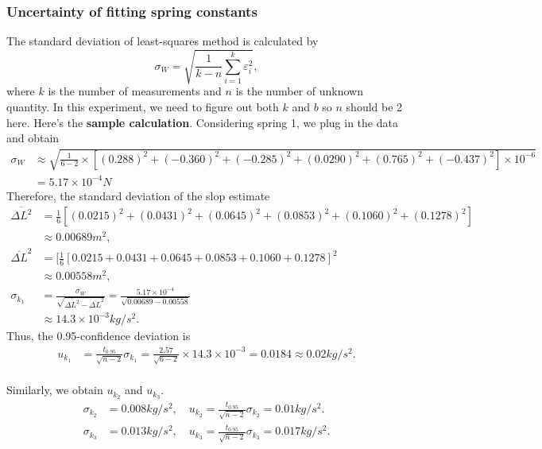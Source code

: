 \subsubsection{Uncertainty of fitting spring constants}
    The standard deviation of least-squares method is calculated by
    \[
        \sigma_W=\sqrt{\frac{1}{k-n}\sum_{i=1}^{k}\varepsilon_i^2},
    \]
    where $k$ is the number of measurements and $n$ is the number of unknown quantity. In this experiment, we need to figure out both $k$ and $b$ so $n$ should be 2 here. Here's the \textbf{sample calculation}. Considering spring 1, we plug in the data and obtain
    \[
    \begin{split}
        \sigma_W&\approx \sqrt{\frac{1}{6-2}\times [(0.288)^2+(-0.360)^2+(-0.285)^2+(0.0290)^2+(0.765)^2+(-0.437)^2]\times 10^{-6}}\\
        &=5.17\times10^{-4} N
    \end{split}
    \]
    Therefore, the standard deviation of the slop estimate
    \[
    \begin{split}
        \overline{\Delta L^2}&=\frac{1}{6}[(0.0215)^2+(0.0431)^2+(0.0645)^2+(0.0853)^2+(0.1060)^2+(0.1278)^2]\\[0.2cm]
        &\approx 0.00689 m^2,\\[0.4cm]
        \overline{\Delta L}^2&=[\frac{1}{6}[0.0215+0.0431+0.0645+0.0853+0.1060+0.1278]^2\\[0.2cm]
        &\approx 0.00558 m^2,\\[0.4cm]
        \sigma_{k_1}&=\frac{\sigma_W}{\sqrt{\overline{\Delta L^2}-\overline{\Delta L}^2}}=\frac{5.17\times10^{-4}}{\sqrt{0.00689-0.00558}}\\[0.2cm]
        &\approx14.3\times10^{-3} kg/s^2.
    \end{split}
    \]
    Thus, the 0.95-confidence deviation is 
    \[
    \begin{split}
        u_{k_1}&=\frac{t_{0.95}}{\sqrt{n-2}}\sigma_{k_1}=\frac{2.57}{\sqrt{6-2}}\times14.3\times10^{-3}= 0.0184\approx 0.02kg/s^2.\\[0.4cm]
    \end{split}
    \]
    
    Similarly, we obtain $u_{k_2}$ and $u_{k_3}$.
    \[
    \begin{split}
        \sigma_{k_2}&=0.008kg/s^2,\quad
        u_{k_2}=\frac{t_{0.95}}{\sqrt{n-2}}\sigma_{k_2}=0.01kg/s^2.\\
        \sigma_{k_3}&=0.013kg/s^2,\quad
        u_{k_3}=\frac{t_{0.95}}{\sqrt{n-2}}\sigma_{k_3}=0.017kg/s^2.\\
    \end{split}
    \]
    
